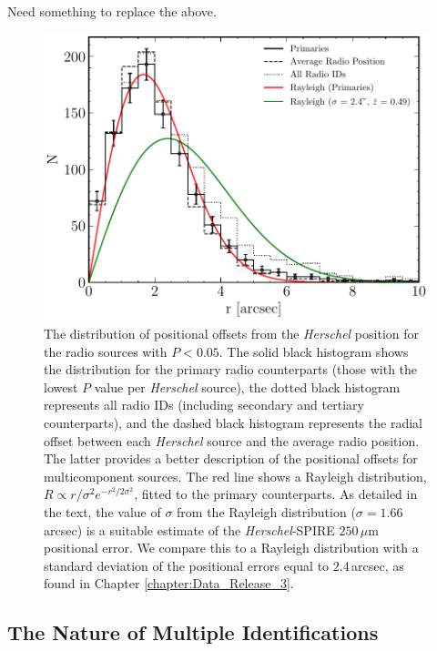 {\color{red} Need something to replace the above.}

\begin{figure}
	\centering
	\includegraphics[width=0.75\columnwidth]{Figures/source_counterpart_offsets.pdf}
	\caption{The distribution of positional offsets from the \textit{Herschel} position for the radio sources with $P < 0.05$. The solid black histogram shows the distribution for the primary radio counterparts (those with the lowest $P$ value per \textit{Herschel} source), the dotted black histogram represents all radio IDs (including secondary and tertiary counterparts), and the dashed black histogram represents the radial offset between each \textit{Herschel} source and the average radio position. The latter provides a better description of the positional offsets for multicomponent sources. The red line shows a Rayleigh distribution, $R \propto r/\sigma^2 e^{-r^2/2\sigma^2}$, fitted to the primary counterparts. As detailed in the text, the value of $\sigma$ from the Rayleigh distribution ($\sigma = 1.66\,$arcsec) is a suitable estimate of the \textit{Herschel}-SPIRE $250\,\mu$m positional error. We compare this to a Rayleigh distribution with a standard deviation of the positional errors equal to $2.4\,$arcsec, as found in Chapter \ref{chapter:Data_Release_3}.}
	\label{fig:source_counterpart_offset}
\end{figure}

\subsection{The Nature of Multiple Identifications}
\label{sec:multiple_systems}

